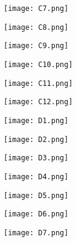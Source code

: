 \documentclass{article}
\begin{document}
\begin{figure}[!hb]
\centering
\texttt{[image:  C7.png]}
\end{figure}

\begin{figure}[!hb]
\centering
\texttt{[image:  C8.png]}
\end{figure}

\begin{figure}[!hb]
\centering
\texttt{[image:  C9.png]}
\end{figure}

\begin{figure}[!hb]
\centering
\texttt{[image:  C10.png]}
\end{figure}

\begin{figure}[!hb]
\centering
\texttt{[image:  C11.png]}
\end{figure}

\begin{figure}[!hb]
\centering
\texttt{[image:  C12.png]}
\end{figure}


\begin{figure}[!hb]
\centering
\texttt{[image:  D1.png]}
\end{figure}

\begin{figure}[!hb]
\centering
\texttt{[image:  D2.png]}
\end{figure}

\begin{figure}[!hb]
\centering
\texttt{[image:  D3.png]}
\end{figure}

\begin{figure}[!hb]
\centering
\texttt{[image:  D4.png]}
\end{figure}

\begin{figure}[!hb]
\centering
\texttt{[image:  D5.png]}
\end{figure}

\begin{figure}[!hb]
\centering
\texttt{[image:  D6.png]}
\end{figure}

\begin{figure}[!hb]
\centering
\texttt{[image:  D7.png]}
\end{figure}
\end{document}
